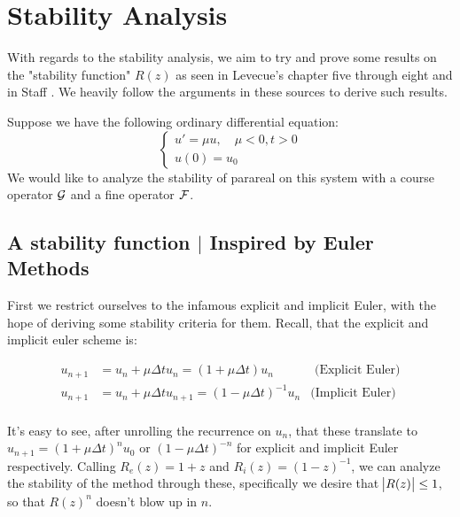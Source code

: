 \section{Stability Analysis}

With regards to the stability analysis, we aim to try and prove some results on
the "stability function" $R(z)$ as seen in Levecue's \cite{levecue} chapter five
through eight and in Staff \cite{staff}. We heavily follow the arguments in
these sources to derive such results.

Suppose we have the following ordinary differential equation:
\begin{equation} \label{eq:lode}
  \begin{cases}
    u' = \mu u, \quad \mu < 0, t > 0 \\
    u(0) = u_0
  \end{cases}
\end{equation}
We would like to analyze the stability of parareal on this system with a 
course operator $\mathcal{G}$ and a fine operator $\mathcal{F}$.

\subsection{A stability function $\mid$ Inspired by Euler Methods}

First we restrict ourselves to the infamous explicit and implicit Euler, with
the hope of deriving some stability criteria for them. Recall, that the explicit
and implicit euler scheme is:

\begin{align*}
  u_{n+1} & = u_n + \mu\Delta t u_n = (1 + \mu \Delta t)u_n & \text{ (Explicit
    Euler)} \\
  u_{n+1} & = u_n + \mu\Delta t u_{n+1} = (1 - \mu \Delta t)^{-1}u_n & \text{
    (Implicit Euler)} \\
\end{align*}

It's easy to see, after unrolling the recurrence on $u_n$, that these translate
to $u_{n+1} = (1+ \mu\Delta t)^n u_0$ or $(1 - \mu\Delta t)^{-n}$ for explicit
and implicit Euler respectively. Calling $R_e(z) = 1 + z$ and $R_i(z) =
(1-z)^{-1}$, we can analyze the stability of the method through these,
specifically we desire that $\abs{R(z)} \leq 1$, so that $R(z)^n$ doesn't blow
up in $n$.

